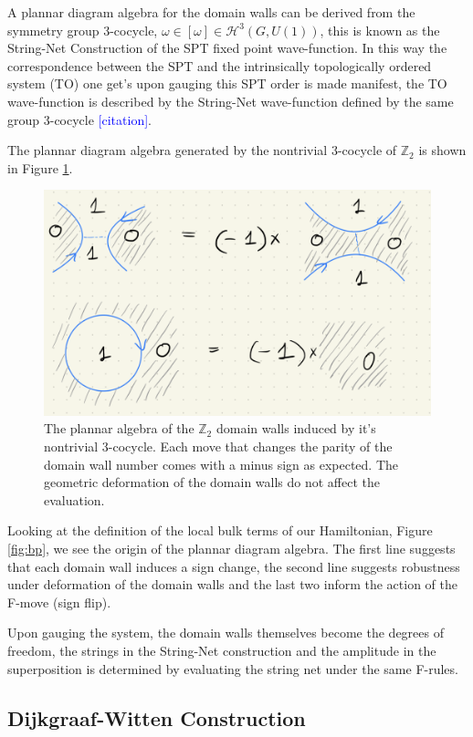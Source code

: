 \documentclass[a4paper,twocolumn,11pt]{quantumarticle}
\newcommand{\jovan}[1]{\textcolor{blue}{[#1]}}
\begin{document}
A plannar diagram algebra for the domain walls can be  derived from the symmetry group 3-cocycle, $\omega \in [\omega] \in \mathcal{H}^3(G, U(1))$, this is known as the String-Net Construction of the SPT fixed point wave-function. In this way the correspondence between the SPT and the intrinsically topologically ordered system (TO) one get's upon gauging this SPT order is made manifest, the TO wave-function is described by the String-Net wave-function defined by the same group 3-cocycle \jovan{citation}. 

The plannar diagram algebra generated by the nontrivial 3-cocycle of $\mathbb{Z}_2$ is shown in Figure \ref{fig:plan_alg}.\begin{figure}
\centering
\includegraphics[width=\linewidth]{Figures/plan_alg.png}
\caption{The plannar algebra of the $\mathbb{Z}_2$ domain walls induced by it's nontrivial 3-cocycle. Each move that changes the parity of the domain wall number comes with a minus sign as expected. The geometric deformation of the domain walls do not affect the evaluation.}
\label{fig:plan_alg}
\end{figure}
Looking at the definition of the local bulk terms of our Hamiltonian, Figure \ref{fig:bp}, we see the origin of the plannar diagram algebra. The first line suggests that each domain wall induces a sign change, the second line suggests robustness under deformation of the domain walls and the last two inform the action of the F-move (sign flip).

Upon gauging the system, the domain walls themselves become the degrees of freedom, the strings in the String-Net construction and the amplitude in the superposition is determined by evaluating the string net under the same F-rules.

\subsection{Dijkgraaf-Witten Construction}
\end{document}
